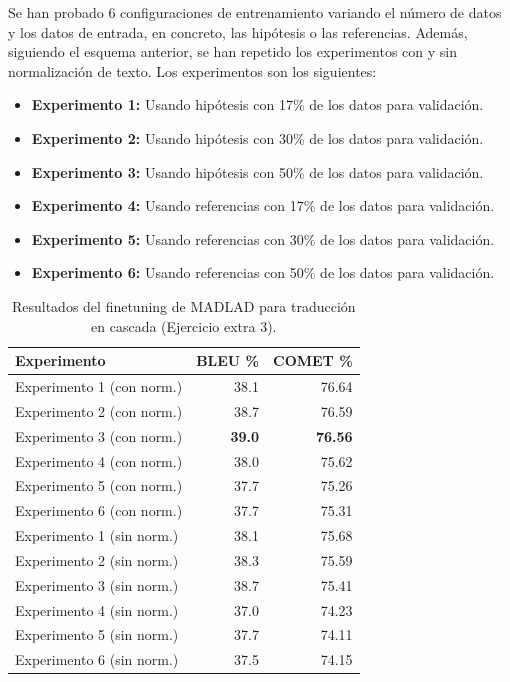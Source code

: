 \documentclass[11pt,spanish,listoffigures,listoftables]{tfgetsinf}
\begin{document}
Se han probado 6 configuraciones de entrenamiento variando el número de datos y los datos de entrada, en concreto, las hipótesis o las referencias. Además, siguiendo el esquema anterior, se han repetido los experimentos con y sin normalización de texto. Los experimentos son los siguientes:
\begin{itemize}
  \item \textbf{Experimento 1:} Usando hipótesis con 17\% de los datos para validación.
  \item \textbf{Experimento 2:} Usando hipótesis con 30\% de los datos para validación.
  \item \textbf{Experimento 3:} Usando hipótesis con 50\% de los datos para validación. 
  \item \textbf{Experimento 4:} Usando referencias con 17\% de los datos para validación.
  \item \textbf{Experimento 5:} Usando referencias con 30\% de los datos para validación.
  \item \textbf{Experimento 6:} Usando referencias con 50\% de los datos para validación.
  
\end{itemize}

\begin{table}[H]
\centering
\begin{tabular}{lrr}
	\toprule
	\textbf{Experimento}  & \textbf{BLEU \%} & \textbf{COMET \%} \\
	\midrule
	Experimento 1 (con norm.) & 38.1 & 76.64 \\
	Experimento 2 (con norm.) & 38.7 & 76.59 \\
	Experimento 3 (con norm.) & \textbf{39.0} & \textbf{76.56} \\
	Experimento 4 (con norm.) & 38.0 & 75.62 \\
	Experimento 5 (con norm.) & 37.7 & 75.26 \\
	Experimento 6 (con norm.) & 37.7 & 75.31 \\
	Experimento 1 (sin norm.) & 38.1 & 75.68 \\
	Experimento 2 (sin norm.) & 38.3 & 75.59 \\
	Experimento 3 (sin norm.) & 38.7 & 75.41 \\
	Experimento 4 (sin norm.) & 37.0 & 74.23 \\
	Experimento 5 (sin norm.) & 37.7 & 74.11 \\
	Experimento 6 (sin norm.) & 37.5 & 74.15 \\
	\bottomrule
\end{tabular}
\caption{Resultados del finetuning de MADLAD para traducción en cascada (Ejercicio extra 3).}
\label{tab:bleu_comet_extra3}
\end{table}
\end{document}

